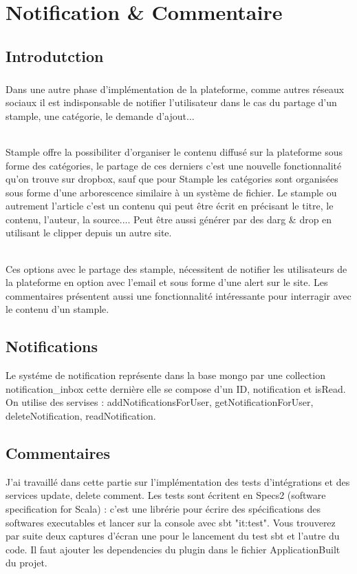 \chapter{Notification \& Commentaire\\}
\section{Introdutction}
\paragraph{}
Dans une autre phase d'implémentation de la plateforme, comme autres réseaux sociaux il est indisponsable de notifier l'utilisateur dans le cas du partage d'un stample, une catégorie, le demande d'ajout...
\subparagraph{}
Stample offre la possibiliter d'organiser le contenu diffusé sur la plateforme sous forme des catégories, le partage de ces derniers c'est une nouvelle fonctionnalité qu'on trouve sur dropbox, sauf que pour Stample les catégories sont organisées sous forme d'une arborescence similaire à un système de fichier.
\newline
Le stample ou autrement l'article c'est un contenu qui peut être écrit en précisant le titre, le contenu, l'auteur, la source....
Peut être aussi générer par des darg \& drop en utilisant le clipper depuis un autre site.
\subparagraph{}
Ces options avec le partage des stample, nécessitent de notifier les utilisateurs de la plateforme en option avec l'email et sous forme d'une alert sur le site.
\newline
Les commentaires présentent aussi une fonctionnalité intéressante pour interragir avec le contenu d'un stample.
\section{Notifications}
Le systéme de notification représente dans la base mongo par une collection notification\_inbox cette dernière elle se compose d'un ID, notification et isRead.
On utilise des servises : addNotificationsForUser, getNotificationForUser, deleteNotification, readNotification.
\section{Commentaires}
J'ai travaillé dans cette partie sur l'implémentation des tests d'intégrations et des services update, delete comment.
Les tests sont écritent en Specs2 (software specification for Scala) : c'est une librérie pour écrire des spécifications des softwares executables et lancer sur la console avec sbt "it:test".
Vous trouverez par suite deux captures d'écran une pour le lancement du test sbt et l'autre du code.
Il faut ajouter les dependencies du plugin dans le fichier ApplicationBuilt du projet.

